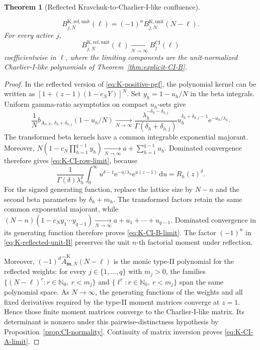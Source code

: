 \documentclass[10pt]{amsart}
\newcommand{\Nzero}{\mathbb N_0}
\newcommand{\e}{\mathrm e}
\newcommand{\dd}{\,\mathrm d}
\newcommand{\mm}{\boldsymbol m}
\theoremstyle{plain}
\newtheorem{theorem}{Theorem}[section]
\theoremstyle{definition}
\theoremstyle{remark}
\begin{document}
\begin{theorem}[Reflected Kravchuk-to-Charlier-I-like confluence]
\begin{enumerate}[label=\textup{(\roman*)}]
\begin{equation}
 B_{j,N}^{\mathrm K,\mathrm{ref},\mathrm{unit}}(\ell)
 =(-1)^nB_{j,N}^{\mathrm K,\mathrm{unit}}(N-\ell).
 \label{eq:K-CI-component-reflection}
\end{equation}
For every active \(j\),
\begin{equation}
 B_{j,N}^{\mathrm K,\mathrm{ref},\mathrm{unit}}(\ell)
 \xrightarrow[N\to\infty]{}B_j^{\mathrm{CI}}(\ell)
 \label{eq:K-CI-component-limit}
\end{equation}
coefficientwise in \(\ell\), where the limiting components are the
unit-normalized Charlier-I-like polynomials of
Theorem~\ref{thm:explicit-CI-B}.
\end{enumerate}
\end{theorem}

\begin{proof}
In the reflected version of \eqref{eq:K-positive-pgf}, the polynomial
kernel can be written as \(\left[1+(z-1)(1-c_NY)\right]^N\).
Set \(y_h=1-u_h/N\) in the beta integrals. Uniform gamma-ratio
asymptotics on compact \(u_h\)-sets give
\[
 \frac1N b_{A_{h,N},\,\delta_h+\delta_{h,j}}
       (1-u_h/N)
 \xrightarrow[N\to\infty]{}
 \frac{\lambda_h^{-\delta_h-\delta_{h,j}}}
 {\Gamma(\delta_h+\delta_{h,j})}
 u_h^{\delta_h+\delta_{h,j}-1}
 \e^{-u_h/\lambda_h}.
\]
The transformed beta kernels have a common integrable exponential
majorant. Moreover,
\(N(1-c_N\prod_{h=1}^{q-1}y_h)
\xrightarrow[N\to\infty]{}a+\sum_{h=1}^{q-1}u_h\).
Dominated convergence therefore gives \eqref{eq:K-CI-row-limit}, because
\[
 \frac{1}{\Gamma(\delta)\lambda_h^\delta}
 \int_0^\infty u^{\delta-1}\e^{-u/\lambda_h}\e^{u(z-1)}\dd u
 =R_h(z)^\delta.
\]
For the signed generating function, replace the lattice size by \(N-n\)
and the second beta parameters by \(\delta_h+m_h\).  The transformed
factors retain the same common exponential majorant, while
\((N-n)(1-c_Ny_1\cdots y_{q-1})
\xrightarrow[N\to\infty]{}a+u_1+\cdots+u_{q-1}\).
Dominated convergence in its generating function therefore proves
\eqref{eq:K-CI-B-limit}. The factor
\((-1)^n\) in \eqref{eq:K-reflected-unit-B} preserves the unit
\(n\)-th factorial moment under reflection.

Moreover, \((-1)^d\widehat A_{\mm,N}^{\mathrm K}(N-\ell)\) is the
monic type-II polynomial for the reflected weights: for every
\(j\in\{1,\ldots,q\}\) with \(m_j>0\), the
families
\(\{(N-\ell)^{\underline r}:r\in\Nzero,\ r<m_j\}\) and
\(\{\ell^{\underline r}:r\in\Nzero,\ r<m_j\}\) span the same
polynomial space.
As \(N\to\infty\), the generating functions of the weights and all fixed
derivatives required by the type-II moment matrices converge at \(z=1\). Hence those finite moment
matrices converge to the Charlier-I-like matrix. Its determinant
is nonzero under this pairwise-distinctness hypothesis by
Proposition~\ref{prop:CI-normality}. Continuity of matrix inversion proves
\eqref{eq:K-CI-A-limit}.


\end{proof}
\end{document}

